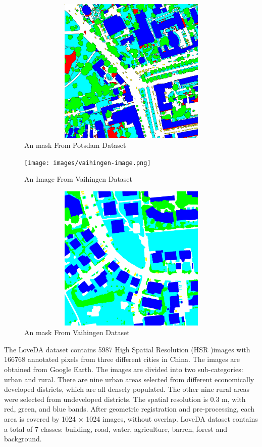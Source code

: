 \begin{figure}[ht]
\includegraphics[width=11.5cm, height=7cm]{images/potsdam-mask.png}
\centering
\caption{An mask From Potsdam Dataset}
\label{fig:potsdam-mask}
\end{figure}

\begin{figure}[ht]
\texttt{[image: images/vaihingen-image.png]}
\centering
\caption{An Image From Vaihingen Dataset}
\label{fig:vaihingen-image}
\end{figure}

\begin{figure}[ht]
\includegraphics[width=11.5cm, height=7cm]{images/vaihingen-mask.png}
\centering
\caption{An mask From Vaihingen Dataset}
\label{fig:vaihingen-mask}
\end{figure}

\FloatBarrier

The LoveDA dataset \cite{loveda} contains 5987 High Spatial Resolution (HSR )images with 166768 annotated pixels from three different cities in China. The images are obtained from Google Earth. The images are divided into two sub-categories: urban and rural. There are nine urban areas selected from different economically developed districts, which are all densely populated. The other nine rural areas were selected from undeveloped districts. The spatial resolution is 0.3 m, with
red, green, and blue bands. After geometric registration and pre-processing, each area is covered by 1024 × 1024 images, without overlap. LoveDA dataset contains a total of 7 classes: building, road, water, agriculture, barren, forest and background.

